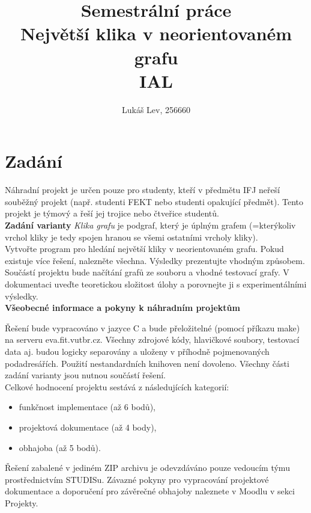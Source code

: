 \documentclass[a4paper]{article}
\title{\textbf{Semestrální práce}\\Největší klika v neorientovaném grafu\\[5pt]IAL}
\author{Lukáš Lev, 256660}
\begin{document}
\maketitle
\newpage

\section{Zadání} \label{sec:zadani}
Náhradní projekt je určen pouze pro studenty, kteří v předmětu IFJ neřeší souběžný projekt (např. studenti FEKT nebo studenti opakující předmět). Tento projekt je týmový a řeší jej trojice nebo čtveřice studentů.\\

\noindent
\textbf{Zadání varianty}
\textit{Klika grafu} je podgraf, který je úplným grafem (=kterýkoliv vrchol kliky je tedy spojen hranou se všemi ostatními vrcholy kliky).\\

\noindent
Vytvořte program pro hledání největší kliky v neorientovaném grafu. Pokud existuje více řešení, nalezněte všechna. Výsledky prezentujte vhodným způsobem. Součástí projektu bude načítání grafů ze souboru a vhodné testovací grafy. V dokumentaci uveďte teoretickou složitost úlohy a porovnejte ji s experimentálními výsledky.\\

\noindent
\textbf{Všeobecné informace a pokyny k náhradním projektům}

\noindent
Řešení bude vypracováno v jazyce C a bude přeložitelné (pomocí příkazu make) na serveru eva.fit.vutbr.cz. Všechny zdrojové kódy, hlavičkové soubory, testovací data aj. budou logicky separovány a uloženy v příhodně pojmenovaných podadresářích. Použití nestandardních knihoven není dovoleno. Všechny části zadání varianty jsou nutnou součástí řešení.\\

\noindent
Celkové hodnocení projektu sestává z následujících kategorií:
\begin{itemize}
    \item funkčnost implementace (až 6 bodů),
    \item projektová dokumentace (až 4 body),
    \item obhajoba (až 5 bodů).
\end{itemize}

\noindent
Řešení zabalené v jediném ZIP archivu je odevzdáváno pouze vedoucím týmu prostřednictvím STUDISu. Závazné pokyny pro vypracování projektové dokumentace a doporučení pro závěrečné obhajoby naleznete v Moodlu v sekci Projekty.
    
\end{document}
